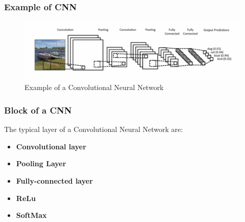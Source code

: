 \documentclass{beamer}
\begin{document}

\begin{frame}
\frametitle{Example of CNN}
\begin{figure}[h]
	\begin{center}
		\includegraphics[scale=0.3]{CNN.png}
		\caption{Example of a Convolutional Neural Network}
		\label{fig:CNN}
	\end{center}
\end{figure}

\end{frame}


\begin{frame}
\frametitle{Block of a CNN}
The typical layer of a Convolutional Neural Network are:

\begin{itemize}

\item \textbf{Convolutional layer}

\item \textbf{Pooling Layer}

\item \textbf{Fully-connected layer}

\item \textbf{ReLu}

\item \textbf{SoftMax}

\end{itemize}

\end{frame}

\end{document}
